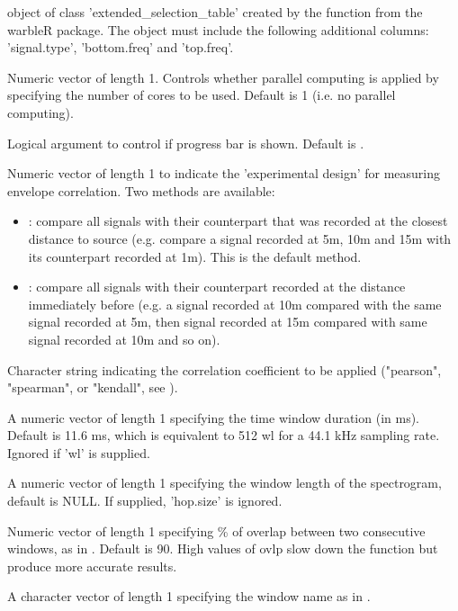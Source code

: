 \documentclass[letterpaper]{book}
\begin{document}
\begin{Arguments}
\begin{ldescription}
\item[\code{X}] object of class 'extended\_selection\_table' created by the function  from the warbleR package. The object must include the following additional columns: 'signal.type', 'bottom.freq' and 'top.freq'.

\item[\code{parallel}] Numeric vector of length 1. Controls whether parallel computing is applied by specifying the number of cores to be used. Default is 1 (i.e. no parallel computing).

\item[\code{pb}] Logical argument to control if progress bar is shown. Default is .

\item[\code{method}] Numeric vector of length 1 to indicate the 'experimental design' for measuring envelope correlation. Two methods are available:
\begin{itemize}

\item{} : compare all signals with their counterpart that was recorded at the closest distance to source (e.g. compare a signal recorded at 5m, 10m and 15m with its counterpart recorded at 1m). This is the default method. 
\item{} : compare all signals with their counterpart recorded at the distance immediately before (e.g. a signal recorded at 10m compared with the same signal recorded at 5m, then signal recorded at 15m compared with same signal recorded at 10m and so on).

\end{itemize}


\item[\code{cor.method}] Character string indicating the correlation coefficient to be applied ("pearson", "spearman", or "kendall", see ).

\item[\code{hop.size}] A numeric vector of length 1 specifying the time window duration (in ms). Default is 11.6 ms, which is equivalent to 512 wl for a 44.1 kHz sampling rate. Ignored if 'wl' is supplied.

\item[\code{wl}] A numeric vector of length 1 specifying the window length of the spectrogram, default 
is NULL. If supplied, 'hop.size' is ignored.

\item[\code{ovlp}] Numeric vector of length 1 specifying \% of overlap between two 
consecutive windows, as in . Default is 90. High values of ovlp 
slow down the function but produce more accurate results.

\item[\code{wn}] A character vector of length 1 specifying the window name as in .
\end{ldescription}
\end{Arguments}
\end{document}
